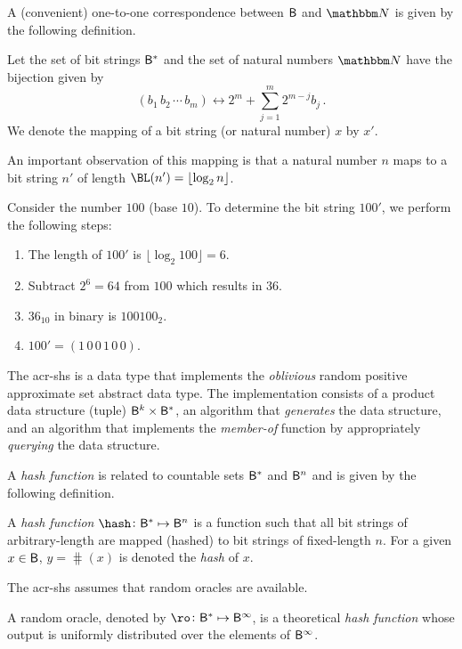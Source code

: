 \documentclass[ ../main.tex]{subfiles}
\begin{document}
A (convenient) one-to-one correspondence between $\Set{B}$ and $\NatSet$ is given by the following definition.
\begin{definition}
\label{def:mapping}
Let the set of bit strings $\Set{B}^{*}$ and the set of natural numbers 
$\NatSet$ have the bijection given by
\begin{equation}
    (b_1 \, b_2 \, \cdots \, b_m) \longleftrightarrow 2^m + \sum_{j=1}^{m} 2^{m - j} b_j\,.
\end{equation}
We denote the mapping of a bit string (or natural number) $x$ by $x'$.
\end{definition}
An important observation of this mapping is that a natural number $n$ maps to a bit string $n'$ of length $\BL(n') = \lfloor \log_2 n \rfloor$.
\begin{example}
Consider the number $100$ (base $10$). To determine the bit string $100'$, we perform the following steps:
\begin{enumerate}
    \item The length of $100'$ is $\lfloor \log_2 100 \rfloor = 6$.
    \item Subtract $2^6 = 64$ from $100$ which results in $36$.
    \item $36_{10}$ in binary is $100100_2$.
    \item $100' = (1\,0\,0\,1\,0\,0)$.
\end{enumerate}
\end{example}

The \gls{acr-shs} is a data type that implements the \emph{oblivious} random 
positive approximate set abstract data type. The implementation consists of a 
product data structure (tuple) $\Set{B}^k \times \Set{B}^{*}$, an algorithm 
that \emph{generates} the data structure, and an algorithm that implements the 
\emph{member-of} function by appropriately \emph{querying} the data structure.

A \emph{hash function} is related to countable sets $\Set{B}^{*}$ and 
$\Set{B}^n$ and is given by the following definition.
\begin{definition}
    A \emph{hash function} $\hash \colon \Set{B}^{*} \mapsto \Set{B}^n$ is a 
    function such that all bit strings of arbitrary-length are mapped (hashed) 
    to bit strings of fixed-length $n$. For a given $x \in \Set{B}$, $y = 
    \hash(x)$ is denoted the \emph{hash} of $x$.
\end{definition}

The \gls{acr-shs} assumes that random oracles are available.
\begin{definition}
\label{def:randomoracle}
A random oracle, denoted by $\ro \colon \Set{B}^{*} \mapsto \Set{B}^\infty$, is 
a theoretical \emph{hash function} whose output is uniformly distributed over 
the elements of $\Set{B}^\infty$.
\end{definition}
\end{document}
